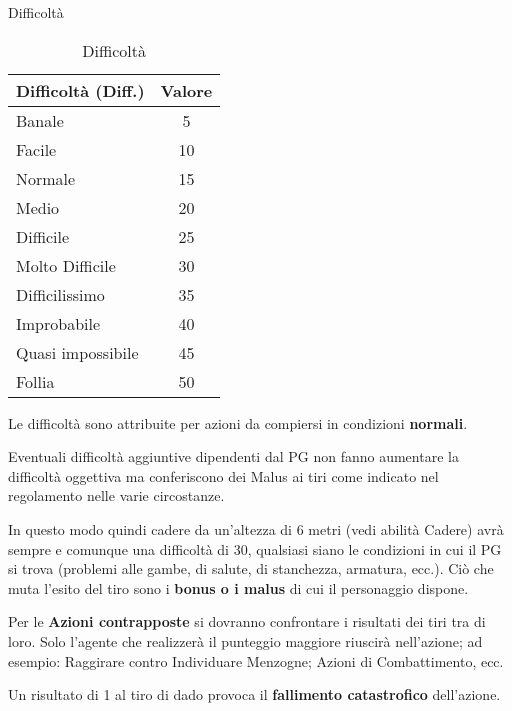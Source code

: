 \begin{table}[ht]
  \centering

  {\Large\sc Difficolt\`a\medskip}

  \begin{tabular}{|l|c|}
    \hline
    Difficolt\`a (Diff.)& Valore\\ \hline\hline
    Banale& 5\\ \hline
    Facile& 10\\ \hline
    Normale& 15\\ \hline
    Medio& 20\\ \hline
    Difficile&25\\ \hline
    Molto Difficile& 30\\ \hline
    Difficilissimo& 35\\ \hline
    Improbabile& 40\\ \hline
    Quasi impossibile& 45\\ \hline
    Follia& 50\\ \hline
  \end{tabular}
  \caption{Difficolt\`a}
  \label{tabdifficolta}
\end{table}

Le difficolt\`a sono attribuite per azioni da compiersi in condizioni
\textbf{normali}.

Eventuali difficolt\`a aggiuntive dipendenti dal PG non fanno
aumentare la difficolt\`a oggettiva ma conferiscono dei Malus ai tiri
come indicato nel regolamento nelle varie circostanze.  

In questo modo quindi cadere da un'altezza di 6 metri (vedi abilit\`a
Cadere) avr\`a sempre e comunque una difficolt\`a di 30, qualsiasi
siano le condizioni in cui il PG si trova (problemi alle gambe, di
salute, di stanchezza, armatura, ecc.). Ci\`o che muta l'esito del
tiro sono i \textbf{bonus o i malus} di cui il personaggio dispone.

Per le \textbf{Azioni contrapposte} si dovranno confrontare i risultati
dei tiri tra di loro.  Solo l'agente che realizzer\`a il punteggio
maggiore riuscir\`a nell'azione; ad esempio: Raggirare contro
Individuare Menzogne; Azioni di Combattimento, ecc.

Un risultato di 1 al tiro di dado provoca il \textbf{fallimento catastrofico}
dell'azione.

\bigskip
{}

